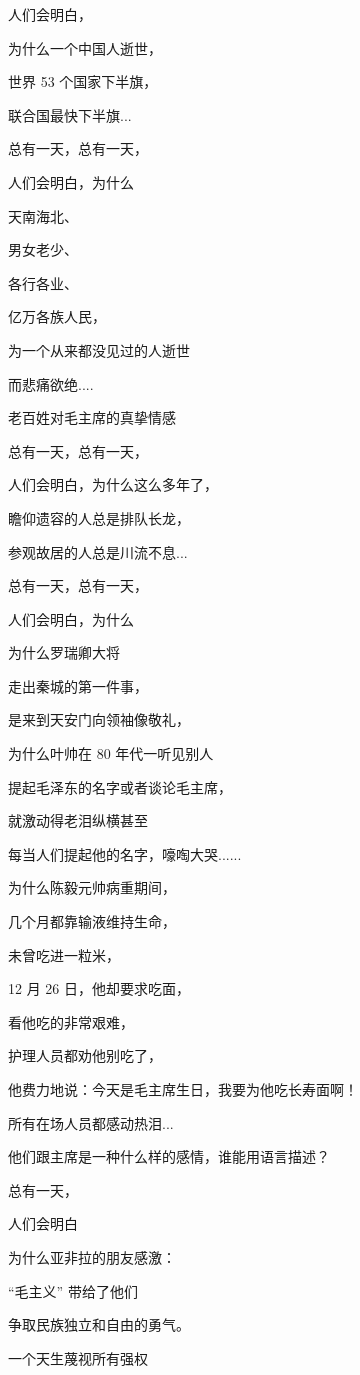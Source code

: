 \documentclass[11pt,twoside,a4paper]{book}
\theoremstyle{thmstyle} %
\theoremstyle{defstyle} %
\theoremstyle{prostyle} %
\begin{document}
人们会明白，

为什么一个中国人逝世，

世界 53 个国家下半旗，

联合国最快下半旗...

总有一天，总有一天，

人们会明白，为什么

天南海北、

男女老少、

各行各业、

亿万各族人民，

为一个从来都没见过的人逝世

而悲痛欲绝....

老百姓对毛主席的真挚情感

总有一天，总有一天，

人们会明白，为什么这么多年了，

瞻仰遗容的人总是排队长龙，

参观故居的人总是川流不息...

总有一天，总有一天，

人们会明白，为什么

为什么罗瑞卿大将

走出秦城的第一件事，

是来到天安门向领袖像敬礼，

为什么叶帅在 80 年代一听见别人

提起毛泽东的名字或者谈论毛主席，

就激动得老泪纵横甚至

每当人们提起他的名字，嚎啕大哭......

为什么陈毅元帅病重期间，

几个月都靠输液维持生命，

未曾吃进一粒米，

12 月 26 日，他却要求吃面，

看他吃的非常艰难，

护理人员都劝他别吃了，

他费力地说：今天是毛主席生日，我要为他吃长寿面啊！

所有在场人员都感动热泪...

他们跟主席是一种什么样的感情，谁能用语言描述？

总有一天，

人们会明白

为什么亚非拉的朋友感激：

“毛主义” 带给了他们

争取民族独立和自由的勇气。

一个天生蔑视所有强权
\end{document}
